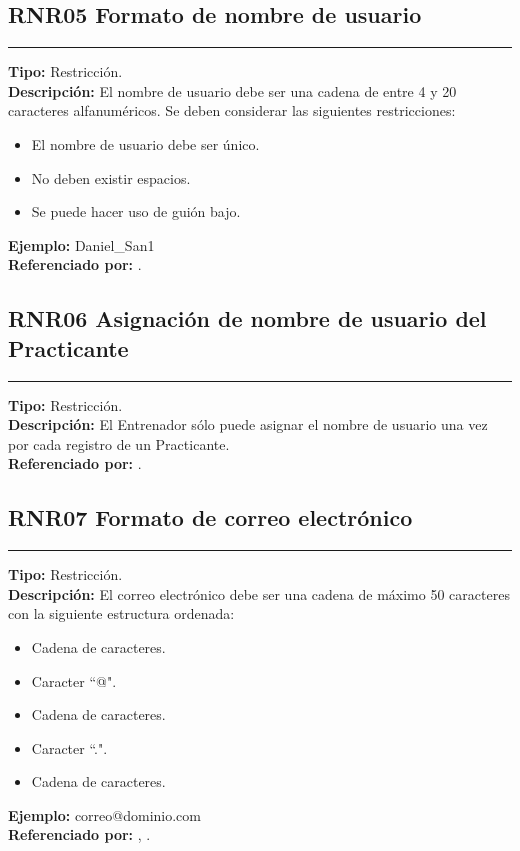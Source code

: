 \subsection{\normalsize{\textcolor[rgb]{0, 0, 0.545098}{RNR05 Formato de nombre de usuario}}}
\label{rn:RNR05}
\rule[3mm]{16.59cm}{0.1mm} \vspace{1mm}
\textbf{Tipo:} Restricción.\\
\textbf{Descripción:} El nombre de usuario debe ser una cadena de entre 4 y 20 caracteres alfanuméricos. Se deben considerar las siguientes restricciones:
\begin{itemize} \itemsep1pt \parskip0pt 
	\item El nombre de usuario debe ser único.
	\item No deben existir espacios.
	\item Se puede hacer uso de guión bajo.
\end{itemize}
\textbf{Ejemplo:} Daniel\_San1\\
\textbf{Referenciado por:}  .\\

\subsection{\normalsize{\textcolor[rgb]{0, 0, 0.545098}{RNR06 Asignación de nombre de usuario del Practicante}}}
\label{rn:RNR06}
\rule[3mm]{16.59cm}{0.1mm} \vspace{1mm}
\textbf{Tipo:} Restricción.\\
\textbf{Descripción:} El Entrenador sólo puede asignar el nombre de usuario una vez por cada registro de un Practicante.\\
\textbf{Referenciado por: }  .\\

\subsection{\normalsize{\textcolor[rgb]{0, 0, 0.545098}{RNR07 Formato de correo electrónico}}}
\label{rn:RNR07}
\rule[3mm]{16.59cm}{0.1mm} \vspace{1mm}
\textbf{Tipo:} Restricción.\\
\textbf{Descripción:} El correo electrónico debe ser una cadena de máximo 50 caracteres con la siguiente estructura ordenada:
\begin{itemize} \itemsep1pt \parskip0pt 
	\item Cadena de caracteres.
	\item Caracter ``@".
	\item Cadena de caracteres.
	\item Caracter ``.".
	\item Cadena de caracteres.
\end{itemize}
\textbf{Ejemplo:} correo@dominio.com\\
\textbf{Referenciado por:} ,  .\\

